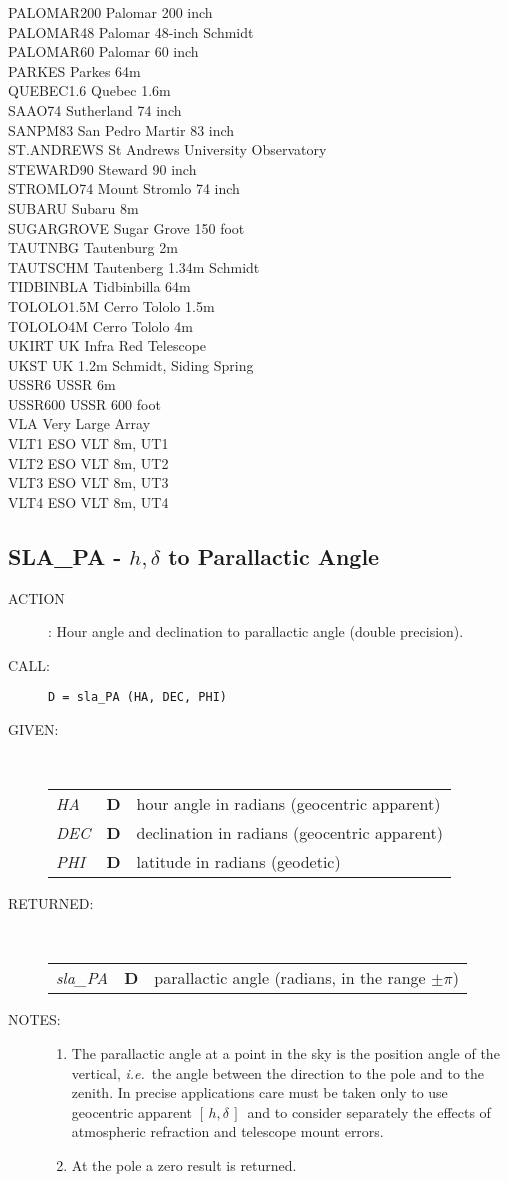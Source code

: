 \documentclass[11pt,twoside]{article}
\newcommand{\xlabel}[1]{}
\newcommand{\hadec}     {$[\,h,\delta\,]$}
\newcommand{\routine}[3]
{\hbadness=10000
  \vbox
  {
    \rule{\textwidth}{0.3mm}\\
    {\Large {\bf #1} \hfill #2 \hfill {\bf #1}}\\
    \setlength{\oldspacing}{\topsep}
    \setlength{\topsep}{0.3ex}
    \begin{description}
      #3
    \end{description}
    \setlength{\topsep}{\oldspacing}
  }
}
\renewcommand{\routine}[3]
   {
      \subsection{#1\xlabel{#1} - #2\label{#1}}
       \begin{description}
         #3
       \end{description}
   }
\newcommand{\action}[1]
{\item[ACTION]: #1}
\newcommand{\action}[1]
   {\item[ACTION:] #1}
\newcommand{\call}[1]
{\item[CALL]: \hspace{0.4em}{\tt #1}}
\newlength{\oldspacing}
\renewcommand{\call}[1]
   {
    \item[CALL:] {\tt #1}
   }
\newcommand{\args}[2]
{
  \goodbreak
  \setlength{\oldspacing}{\topsep}
  \setlength{\topsep}{0.3ex}
  \begin{description}
  \item[#1]:\\[1.5ex]
    \begin{tabular}{p{7em}p{6em}p{22em}}
      #2
    \end{tabular}
  \end{description}
  \setlength{\topsep}{\oldspacing}
}
\renewcommand{\args}[2]
   {
     \begin{description}
        \item[#1:]\\
        \begin{tabular}{p{7em}p{6em}l}
           #2
        \end{tabular}
     \end{description}
   }
\newcommand{\spec}[3]
{
  {\em {#1}} & {\bf \mbox{#2}} & {#3}
}
\newcommand{\notes}[1]
{
  \goodbreak
  \setlength{\oldspacing}{\topsep}
  \setlength{\topsep}{0.3ex}
  \begin{description}
    \item[NOTES]:
        #1
  \end{description}
  \setlength{\topsep}{\oldspacing}
}
\renewcommand{\notes}[1]
   {
      \begin{description}
         \item[NOTES:]
            #1
      \end{description}
   }
\begin{document}
{\begin{tabbing}
PALOMAR200 \> Palomar 200 inch \\
PALOMAR48 \> Palomar 48-inch Schmidt \\
PALOMAR60 \> Palomar 60 inch \\
PARKES \> Parkes 64m \\
QUEBEC1.6 \> Quebec 1.6m \\
SAAO74 \> Sutherland 74 inch \\
SANPM83 \> San Pedro Martir 83 inch \\
ST.ANDREWS \> St Andrews University Observatory \\
STEWARD90 \> Steward 90 inch \\
STROMLO74 \> Mount Stromlo 74 inch \\
SUBARU \> Subaru 8m \\
SUGARGROVE \> Sugar Grove 150 foot \\
TAUTNBG \> Tautenburg 2m \\
TAUTSCHM \> Tautenberg 1.34m Schmidt \\
TIDBINBLA \> Tidbinbilla 64m \\
TOLOLO1.5M \> Cerro Tololo 1.5m \\
TOLOLO4M \> Cerro Tololo 4m \\
UKIRT \> UK Infra Red Telescope \\
UKST \> UK 1.2m Schmidt, Siding Spring \\
USSR6 \> USSR 6m \\
USSR600 \> USSR 600 foot \\
VLA \> Very Large Array \\
VLT1 \> ESO VLT 8m, UT1 \\
VLT2 \> ESO VLT 8m, UT2 \\
VLT3 \> ESO VLT 8m, UT3 \\
VLT4 \> ESO VLT 8m, UT4
\end{tabbing}
}
\routine{SLA\_PA}{$h,\delta$ to Parallactic Angle}
{
 \action{Hour angle and declination to parallactic angle
         (double precision).}
 \call{D~=~sla\_PA (HA, DEC, PHI)}
}
\args{GIVEN}
{
 \spec{HA}{D}{hour angle in radians (geocentric apparent)} \\
 \spec{DEC}{D}{declination in radians (geocentric apparent)} \\
 \spec{PHI}{D}{latitude in radians (geodetic)}
}
\args{RETURNED}
{
 \spec{sla\_PA}{D}{parallactic angle (radians, in the range $\pm \pi$)}
}
\notes
{
 \begin{enumerate}
  \item The parallactic angle at a point in the sky is the position
        angle of the vertical, {\it i.e.}\ the angle between the direction to
        the pole and to the zenith.  In precise applications care must
        be taken only to use geocentric apparent \hadec\ and to consider
        separately the effects of atmospheric refraction and telescope
        mount errors.
  \item At the pole a zero result is returned.
 \end{enumerate}
}
\end{document}
